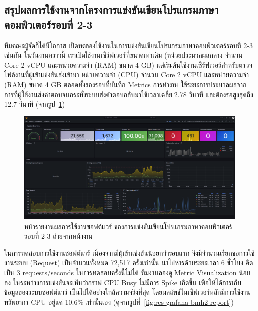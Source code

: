\documentclass[12pt,one side,openright,a4paper]{cpe-thesis-th}
\newcommand{\thaijustify}[1]{%
  \par\hspace{30pt}\justifying
  #1
}
\begin{document}
\subsection{สรุปผลการใช้งานจากโครงการแข่งขันเขียนโปรแกรมภาษาคอมพิวเตอร์รอบที่ 2-3}
\thaijustify{
  ทีมคณะผู้จัดก็ได้มีโอกาส เปิดทดลองใช้งานในการแข่งขันเขียนโปรแกรมภาษาคอมพิวเตอร์รอบที่ 2-3 เช่นกัน ในวันงานคราวนี้ เราเปิดใช้งานเซิร์ฟเวอร์ที่ขนาดเท่าเดิม (หน่วยประมวลผลกลาง จำนวน Core 2 vCPU และหน่วยความจำ (RAM) ขนาด 4 GB) แต่เริ่มต้นใช้งานเซิร์ฟเวอร์สำหรับตรวจไฟล์งานที่ผู้เข้าแข่งขันส่งเข้ามา หน่วยความจำ (CPU) จำนวน Core 2 vCPU และหน่วยความจำ (RAM) ขนาด 4 GB ตลอดทั้งสองรอบที่บันทึก Metrics การทำงาน ใช้ระยะการประมวลผลจากการที่ผู้ใช้งานส่งคำตอบจนกระทั่งระบบส่งคำตอบกลับมาใช้เวลาเฉลี่ย 2.78 วินาที และต้องรอสูงสุดถึง 12.7 วินาที (จากรูป~\ref{fig:res-grafana-bmh2})
}
\begin{figure}[H]
  \centering
  \includegraphics[width=12cm]{figure/results/grafana/grafana-bmh2-raw.png}
  \caption[หน้ารายงานผลการใช้งานซอฟต์แวร์ ของการแข่งขันเขียนโปรแกรมภาษาคอมพิวเตอร์รอบที่ 2-3 ถ่ายจากหน้างาน]{หน้ารายงานผลการใช้งานซอฟต์แวร์ ของการแข่งขันเขียนโปรแกรมภาษาคอมพิวเตอร์รอบที่ 2-3 ถ่ายจากหน้างาน}
  \label{fig:res-grafana-bmh2}
\end{figure}
\thaijustify{
  ในการทดสอบการใช้งานซอฟต์แวร์ เนื่องจากมีผู้เข้าแข่งขันน้อยกว่ารอบแรก จึงมีจำนวนเรียกขอการใช้งานระบบ (Request) เป็นจำนวนทั้งหมด 72,517 ครั้งเท่านั้น นำไปหารด้วยระยะเวลา 6 ชั่วโมง คิดเป็น 3 requests/seconds ในการทดสอบครั้งนี้ไม่ได้ ทีมงานลองดู Metric Visualization น้อยลง ในระหว่างการแข่งขันจะเห็นว่ากราฟ CPU Busy ไม่มีการ Spike เกิดขึ้น เพื่อให้ได้การเก็บข้อมูลของระบบซอฟต์แวร์ เป็นไปได้อย่างใกล้ความจริงที่สุด โดยผลลัพธ์ในเซิฟเวอร์หลักมีการใช้งานทรัพยากร CPU อยู่แค่ 10.6\% เท่านั้นเอง (ดูจากรูปที่~\ref{fig:res-grafana-bmh2-report})
}
\end{document}
